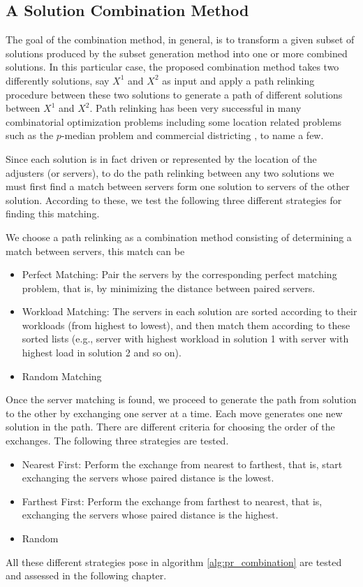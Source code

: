 \subsection{A Solution Combination Method}
The goal of the combination method,
in general,
is to transform a given subset of solutions
produced by the subset generation method
into one or more combined solutions.
In this particular case,
the proposed combination method
takes two differently solutions,
say $X^1$ and $X^2$ as input
and apply a path relinking procedure
between these two solutions
to generate a path of different solutions
between $X^1$ and $X^2$.
Path relinking \cite{glover2000fundamentals}
has been very successful
in many combinatorial optimization problems
including some location related problems
such as the $p$-median problem \cite{resende2004hybrid}
and commercial districting \cite{rios2016grasp}, to name a few.

Since each solution is in fact driven or represented
by the location of the adjusters (or servers),
to do the path relinking between any two solutions
we must first find a match between servers
form one solution to servers of the other solution.
According to these,
we test the following three different strategies
for finding this matching.

We choose a path relinking as a combination method
consisting of
determining a match between servers,
this match can be
\begin{itemize}
\item Perfect Matching:
  Pair the servers by the corresponding perfect matching problem,
  that is,
  by minimizing the distance between paired servers.
\item Workload Matching:
  The servers in each solution
  are sorted according to their workloads
  (from highest to lowest),
  and then
  match them according to these sorted lists
  (e.g.,
  server with highest workload in solution 1
  with server with highest load in solution 2
  and so on).
\item Random Matching
\end{itemize}
Once the server matching is found,
we proceed to generate the path
from solution to the other
by exchanging one server at a time.
Each move generates one new solution in the path.
There are different criteria
for choosing the order of the exchanges.
The following three strategies are tested.
\begin{itemize}
\item Nearest First:
  Perform the exchange
  from nearest to farthest,
  that is,
  start exchanging the servers
  whose paired distance
  is the lowest.
\item Farthest First:
  Perform the exchange from farthest to nearest,
  that is,
  exchanging the servers
  whose paired distance
  is the highest.
\item Random
\end{itemize}

All these different strategies
pose in algorithm \ref{alg:pr_combination}
are tested and assessed
in the following chapter.
